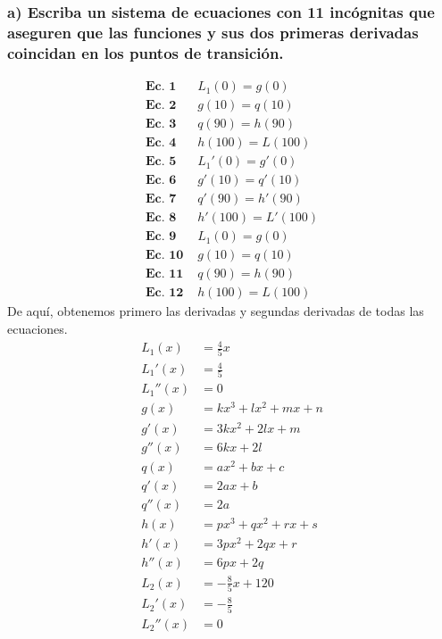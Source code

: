 \documentclass[11pt,letterpaper]{article}
\begin{document}
\subsubsection{a) Escriba un sistema de ecuaciones con 11 incógnitas que aseguren que las funciones y sus dos primeras derivadas coincidan en los puntos de transición.}
\begin{equation*}
  \begin{split}
    \textbf{Ec. 1 } & L_1(0)=g(0) \\
    \textbf{Ec. 2 } & g(10)=q(10) \\
    \textbf{Ec. 3 } & q(90)=h(90) \\
    \textbf{Ec. 4 } & h(100)=L(100) \\
    \textbf{Ec. 5 } & L_1'(0)=g'(0) \\
    \textbf{Ec. 6 } & g'(10)=q'(10) \\
    \textbf{Ec. 7 } & q'(90)=h'(90) \\
    \textbf{Ec. 8 } & h'(100)=L'(100) \\
    \textbf{Ec. 9 } & L_1(0)=g(0) \\
    \textbf{Ec. 10 } & g(10)=q(10) \\
    \textbf{Ec. 11 } & q(90)=h(90) \\
    \textbf{Ec. 12 } & h(100)=L(100)
  \end{split}
\end{equation*}
De aquí, obtenemos primero las derivadas y segundas derivadas de todas las ecuaciones.
\begin{equation*}
  \begin{split}
    L_1(x) &= \frac{4}{5}x \\
    L_1'(x) &= \frac{4}{5} \\
    L_1''(x) &= 0 \\
    g(x) &= kx^3+lx^2+mx+n \\
    g'(x) &= 3kx^2+2lx+m \\
    g''(x) &= 6kx+2l \\
    q(x) &= ax^2+bx+c \\
    q'(x) &= 2ax+b \\
    q''(x) &= 2a \\
    h(x) &= px^3+qx^2+rx+s \\
    h'(x) &= 3px^2+2qx+r \\
    h''(x) &= 6px+2q \\
    L_2(x) &= -\frac{8}{5}x+120 \\
    L_2'(x) &= -\frac{8}{5} \\
    L_2''(x) &= 0
  \end{split}
\end{equation*}
\end{document}
